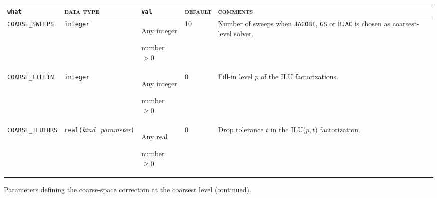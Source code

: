 \bsideways
\begin{center}
\begin{tabular}{|p{3.9cm}|l|p{2cm}|p{1.5cm}|p{7.5cm}|}
\hline
\verb|what|              & \textsc{data type}        &  \verb|val|      &  \textsc{default}  &
\textsc{comments} \\ \hline
\verb|COARSE_SWEEPS| & \verb|integer|                         
                         & Any integer \par number $> 0$
                         & 10
                         & Number of sweeps when \verb|JACOBI|, \verb|GS| or \verb|BJAC|
                           is chosen as coarsest-level solver. \\ \hline
\verb|COARSE_FILLIN| & \verb|integer|
                         & Any integer \par number $\ge 0$
                         & 0
                         & Fill-in level $p$ of the ILU factorizations. \\ \hline
\verb|COARSE_ILUTHRS|
                         & \verb|real(|\emph{kind\_parameter}\verb|)|
                         & Any real \par number $\ge 0$
                         & 0
                         & Drop tolerance $t$ in the ILU($p,t$) factorization. \\
\hline
\end{tabular}
\end{center}
\caption{Parameters defining the coarse-space correction at the coarsest
level (continued).\label{tab:p_coarse_1}} 
\esideways

